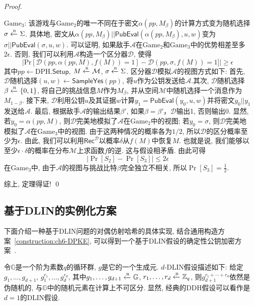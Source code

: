\begin{proof}
\begin{trivlist}
\item $\text{Game}_3$: 该游戏与$\text{Game}_2$的唯一不同在于密文$\alpha(pp, M_\beta)$的计算方式变为随机选择$\sigma \xleftarrow{\textup{\tiny R}} \Sigma$. 具体地, 密文从$\alpha(pp, M_\beta)||\mathsf{PubEval}(\alpha(pp, M_\beta), u, w)$变为$\sigma||\mathsf{PubEval}(\sigma, u, w)$. 可以证明, 如果敌手$\mathcal{A}$在$\text{Game}_2$和$\text{Game}_3$中的优势相差至多$2\epsilon$. 否则, 我们可以利用$\mathcal{A}$构造一个区分器$\mathcal{D}$, 使得
\[
\left|\text{Pr}[\mathcal{D}(pp, \alpha(pp, M), f(M)) = 1] - \mathcal{D}(pp, \sigma, f(M)) = 1]\right| \geq \epsilon
\]
其中$pp \leftarrow \text{DPH}.\mathsf{Setup}$, $M \xleftarrow{\textup{\tiny R}} \mathcal{M}$, $\sigma \xleftarrow{\textup{\tiny R}} \Sigma$. 区分器$\mathcal{D}$模拟$\mathcal{A}$的视图方式如下: 首先, $\mathcal{D}$随机选择$(u, w) \leftarrow \mathsf{SampleYes}(pp)$, 将$u$作为公钥发送给$\mathcal{A}$.其次, $\mathcal{D}$随机选择$\beta \xleftarrow{\textup{\tiny R}} \{0, 1\}$, 将自己的挑战信息$M$作为$M_\beta$, 并从空间$\mathcal{M}$中随机选择一个消息作为$M_{1 - \beta}$. 接下来, $\mathcal{D}$利用公钥$u$及其证据$w$计算$y_1 = \mathsf{PubEval}(y_0, u, w)$并将密文$y_0||y_1$发送给$\mathcal{A}$. 最后, 根据敌手$\mathcal{A}$的输出结果$\beta'$, 如果$\beta = \beta'$，$\mathcal{D}$输出1, 否则输出0. 显然, 若$y_0 = \alpha(pp, M)$, 则$\mathcal{D}$完美地模拟了$\mathcal{A}$在$\text{Game}_2$中的视图; 若$y_0 = \sigma$, 则$\mathcal{D}$完美地模拟了$\mathcal{A}$在$\text{Game}_3$中的视图. 由于这两种情况的概率各为$1/2$, 所以$\mathcal{D}$的区分概率至少为$\epsilon$. 由此, 我们可以利用$\mathsf{Rec}^{\mathcal{D}}$以概率$\delta$从$f(M)$中恢复$M$. 也就是说, 我们能够以至少$\epsilon \cdot \delta$的概率在分布$\mathcal{M}$上求函数$f$的逆. 这与假设相矛盾. 由此可得
\[
|\Pr[S_2] - \Pr[S_3]| \leq 2\epsilon
\]
在$\text{Game}_3$中, 由于$\mathcal{A}$的视图与挑战比特$\beta$完全独立不相关, 所以$\Pr[S_3] = \frac{1}{2}$.
\end{trivlist}

综上, 定理得证! \qed
\end{proof}

\subsection{基于DLIN的实例化方案}
下面介绍一种基于DLIN问题的对偶仿射哈希的具体实现, 结合通用构造方案~\ref{construction:ch6-DPKE}, 可以得到一个基于DLIN假设的确定性公钥加密方案~\cite{BS2011}.

令$\mathbb{G}$是一个阶为素数$q$的循环群, $g$是它的一个生成元. $d$-DLIN假设描述如下: 给定$g_1, \ldots, g_{d+1}$, $g_1^{r_1}, \ldots, g_d^{r_d}$, 其中$g_1, \ldots, g_{d+1} \xleftarrow{\textup{\tiny R}} \mathbb{G}$, $r_1, \ldots, r_d \xleftarrow{\textup{\tiny R}} \mathbb{Z}_q$, 则$g_{d+1}^{r_1 + \cdots + r_d}$依然是伪随机的, 与$\mathbb{G}$中的随机元素在计算上不可区分. 显然, 经典的DDH假设可以看作是$d = 1$的DLIN假设.

